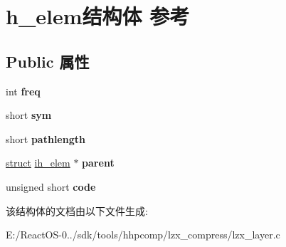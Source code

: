 \hypertarget{structh__elem}{}\section{h\+\_\+elem结构体 参考}
\label{structh__elem}
\subsection*{Public 属性}
\begin{DoxyCompactItemize}
\item 
\mbox{\label{structh__elem_adb55c0393810643372306908a21cf99a}} 
int {\bfseries freq}
\item 
\mbox{\label{structh__elem_a633e047936108dc1920a31401def46b7}} 
short {\bfseries sym}
\item 
\mbox{\label{structh__elem_adada6f37afe8bd1359fa05aedb2b2a93}} 
short {\bfseries pathlength}
\item 
\mbox{\label{structh__elem_a3324c05736bd1e3f2cc0095efc7d3209}} 
\hyperlink{interfacestruct}{struct} \hyperlink{structih__elem}{ih\+\_\+elem} $\ast$ {\bfseries parent}
\item 
\mbox{\label{structh__elem_a12bddbc7d59398e724e94b56bd5f87a0}} 
unsigned short {\bfseries code}
\end{DoxyCompactItemize}


该结构体的文档由以下文件生成\+:\begin{DoxyCompactItemize}
\item 
E\+:/\+React\+O\+S-\/0../sdk/tools/hhpcomp/lzx\+\_\+compress/lzx\+\_\+layer.\+c\end{DoxyCompactItemize}
